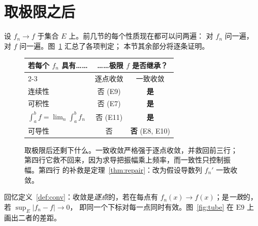 \section{取极限之后}
\label{sec:lim}

设 $f_n \to f$ 于集合 $E$ 上。前几节的每个性质现在都可以问两遍：
对 $f_n$ 问一遍，对 $f$ 问一遍。图~\ref{fig:blockc} 汇总了各项判定；
本节其余部分将逐条证明。

\begin{figure}[htbp]
\centering
\begin{tabular}{@{}lcc@{}}
\toprule
若每个 $f_n$ 具有…… & \multicolumn{2}{c}{……极限 $f$ 是否继承？} \\
\cmidrule(l){2-3}
 & 逐点收敛 & 一致收敛 \\
\midrule
连续性                              & 否 (E9)  & \textbf{是} \\
可积性                              & 否 (E7)  & \textbf{是} \\
$\int_a^b f = \lim_n \int_a^b f_n$  & 否 (E11) & \textbf{是} \\
\addlinespace[3pt]
可导性                              & 否       & \textbf{否} (E8, E10) \\
\bottomrule
\end{tabular}
\caption{取极限后还剩下什么。一致收敛严格强于逐点收敛，并救回前三行；
第四行它救不回来，因为求导把振幅乘上频率，而一致性只控制振幅。第四行
的补救是定理~\ref{thm:repair}：改为假设导数列 $f_n'$ 一致收敛。}
\label{fig:blockc}
\end{figure}

回忆定义~\ref{def:conv}：收敛是\emph{逐点}的，若在每点有
$f_n(x)\to f(x)$；是\emph{一致}的，若 $\sup_E|f_n-f|\to0$，
即同一个下标对每一点同时有效。图~\ref{fig:tube} 在 $\mathrm{E}9$ 上
画出二者的差距。

